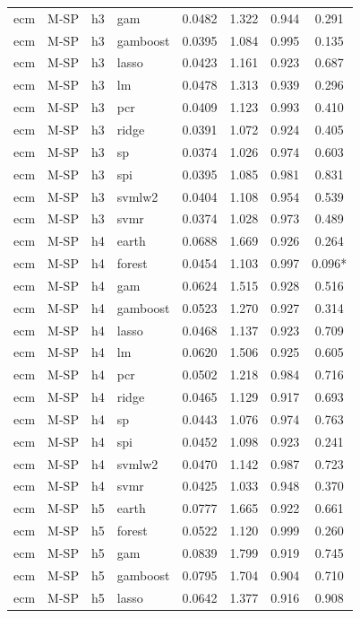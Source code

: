 \begin{ThreePartTable}
\begin{longtable}[t]{llclcccc}
ecm & M-SP & h3 & gam & 0.0482 & 1.322 & 0.944 & 0.291\\
ecm & M-SP & h3 & gamboost & 0.0395 & 1.084 & 0.995 & 0.135\\
ecm & M-SP & h3 & lasso & 0.0423 & 1.161 & 0.923 & 0.687\\
ecm & M-SP & h3 & lm & 0.0478 & 1.313 & 0.939 & 0.296\\
ecm & M-SP & h3 & pcr & 0.0409 & 1.123 & 0.993 & 0.410\\
ecm & M-SP & h3 & ridge & 0.0391 & 1.072 & 0.924 & 0.405\\
ecm & M-SP & h3 & sp & 0.0374 & 1.026 & 0.974 & 0.603\\
ecm & M-SP & h3 & spi & 0.0395 & 1.085 & 0.981 & 0.831\\
ecm & M-SP & h3 & svmlw2 & 0.0404 & 1.108 & 0.954 & 0.539\\
ecm & M-SP & h3 & svmr & 0.0374 & 1.028 & 0.973 & 0.489\\
\addlinespace
ecm & M-SP & h4 & earth & 0.0688 & 1.669 & 0.926 & 0.264\\
ecm & M-SP & h4 & forest & 0.0454 & 1.103 & 0.997 & 0.096*\\
ecm & M-SP & h4 & gam & 0.0624 & 1.515 & 0.928 & 0.516\\
ecm & M-SP & h4 & gamboost & 0.0523 & 1.270 & 0.927 & 0.314\\
ecm & M-SP & h4 & lasso & 0.0468 & 1.137 & 0.923 & 0.709\\
ecm & M-SP & h4 & lm & 0.0620 & 1.506 & 0.925 & 0.605\\
ecm & M-SP & h4 & pcr & 0.0502 & 1.218 & 0.984 & 0.716\\
ecm & M-SP & h4 & ridge & 0.0465 & 1.129 & 0.917 & 0.693\\
ecm & M-SP & h4 & sp & 0.0443 & 1.076 & 0.974 & 0.763\\
ecm & M-SP & h4 & spi & 0.0452 & 1.098 & 0.923 & 0.241\\
ecm & M-SP & h4 & svmlw2 & 0.0470 & 1.142 & 0.987 & 0.723\\
ecm & M-SP & h4 & svmr & 0.0425 & 1.033 & 0.948 & 0.370\\
\addlinespace
ecm & M-SP & h5 & earth & 0.0777 & 1.665 & 0.922 & 0.661\\
ecm & M-SP & h5 & forest & 0.0522 & 1.120 & 0.999 & 0.260\\
ecm & M-SP & h5 & gam & 0.0839 & 1.799 & 0.919 & 0.745\\
ecm & M-SP & h5 & gamboost & 0.0795 & 1.704 & 0.904 & 0.710\\
ecm & M-SP & h5 & lasso & 0.0642 & 1.377 & 0.916 & 0.908\\

\end{longtable}
\end{ThreePartTable}
